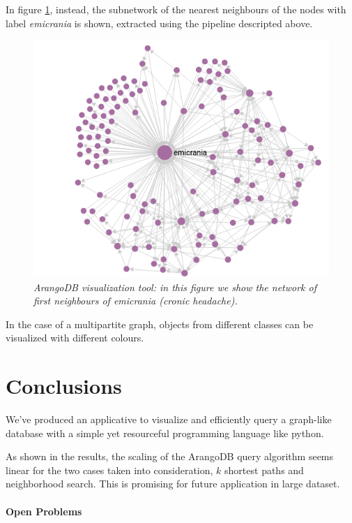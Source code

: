 \documentclass[11pt,twocolumn]{article}
\begin{document}
In figure \ref{fig:4}, instead, the subnetwork of the nearest neighbours of the nodes with label \textit{emicrania} is shown, extracted using the pipeline descripted above.

\begin{figure}[ht!]
   \includegraphics[width=\linewidth]{images/neigh_emicrania.png}
   \caption{\small{\textit{ArangoDB visualization tool: in this figure we show the network of first neighbours of \textit{emicrania} (cronic headache).}}}
   \label{fig:4}
\end{figure}

In the case of a multipartite graph, objects from different classes can be visualized with different colours.

\newpage

\section{Conclusions}
\balance %
We've produced an applicative to visualize and efficiently query a graph-like database with a simple yet resourceful programming language like python.

As shown in the results, the scaling of the ArangoDB query algorithm seems linear for the two cases taken into consideration, $k$ shortest paths and neighborhood search. This is promising for future application in large dataset.

\paragraph{Open Problems}
\end{document}

